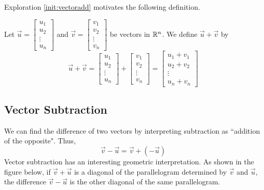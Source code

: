 \documentclass{ximera}
\begin{document}
Exploration \ref{init:vectoradd} motivates the following definition.
  \begin{definition}\label{def:vectoradd} 
  Let $\vec{u}=\begin{bmatrix}
u_1\\
u_2\\
\vdots\\
u_n
\end{bmatrix}$ and $\vec{v}=\begin{bmatrix}
v_1\\
v_2\\
\vdots\\
v_n
\end{bmatrix}$ be vectors in $\mathbb{R}^n$.  We define $\vec{u}+\vec{v}$ by
  $$\vec{u}+\vec{v}=\begin{bmatrix}
u_1\\
u_2\\
\vdots\\
u_n
\end{bmatrix}+\begin{bmatrix}
v_1\\
v_2\\
\vdots\\
v_n
\end{bmatrix}=\begin{bmatrix}
u_1+v_1\\
u_2+v_2\\
\vdots\\
u_n+v_n
\end{bmatrix}$$
  
\end{definition}

\subsection*{Vector Subtraction}
We can find the difference of two vectors by interpreting subtraction as ``addition of the opposite".  Thus,
$$\vec{v}-\vec{u}=\vec{v}+(-\vec{u})$$
Vector subtraction has an interesting geometric interpretation.  As shown in the figure below, if $\vec{v}+\vec{u}$ is a diagonal of the parallelogram determined by $\vec{v}$ and $\vec{u}$, the difference $\vec{v}-\vec{u}$ is the other diagonal of the same parallelogram.
\end{document}
